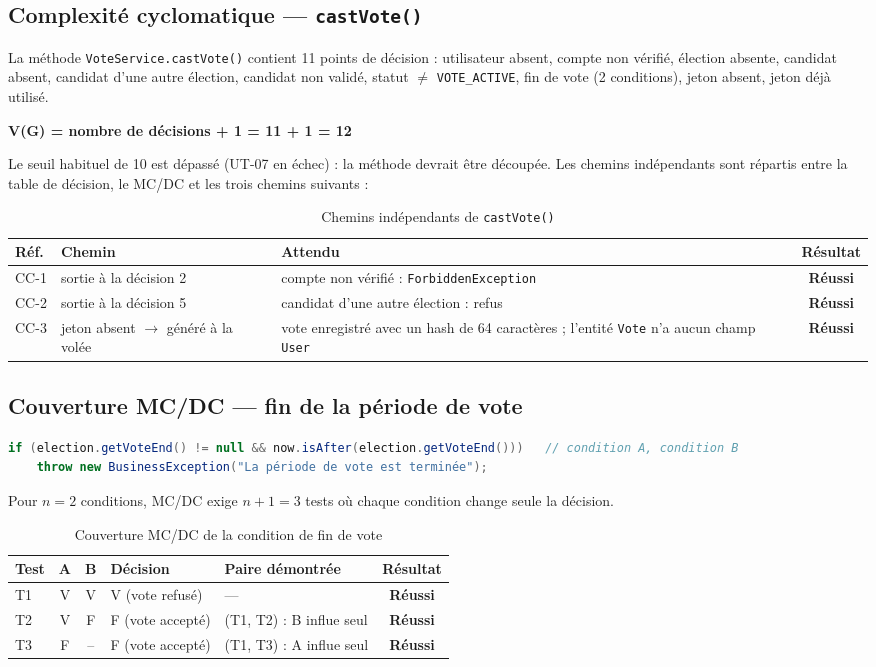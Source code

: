 \documentclass[12pt,a4paper]{report}
\newcommand{\ok}{\textcolor{okgreen}{\textbf{Réussi}}}
\begin{document}
\subsection{Complexité cyclomatique --- \texttt{castVote()}}
La méthode \texttt{VoteService.castVote()} contient 11 points de décision : utilisateur absent, compte non vérifié, élection absente, candidat absent, candidat d'une autre élection, candidat non validé, statut $\neq$ \texttt{VOTE\_ACTIVE}, fin de vote (2 conditions), jeton absent, jeton déjà utilisé.
\begin{center}\textbf{V(G) = nombre de décisions + 1 = 11 + 1 = 12}\end{center}
Le seuil habituel de 10 est dépassé (UT-07 en échec) : la méthode devrait être découpée. Les chemins indépendants sont répartis entre la table de décision, le MC/DC et les trois chemins suivants :
\begin{table}[H]
\centering
\caption{Chemins indépendants de \texttt{castVote()}}
\small
\begin{tabularx}{\textwidth}{@{}lp{4.4cm}Xc@{}}
\toprule
\rowcolor{evlight}\textbf{Réf.} & \textbf{Chemin} & \textbf{Attendu} & \textbf{Résultat}\\
\midrule
CC-1 & sortie à la décision 2 & compte non vérifié : \texttt{ForbiddenException} & \ok\\
CC-2 & sortie à la décision 5 & candidat d'une autre élection : refus & \ok\\
CC-3 & jeton absent $\rightarrow$ généré à la volée & vote enregistré avec un hash de 64 caractères ; l'entité \texttt{Vote} n'a aucun champ \texttt{User} & \ok\\
\bottomrule
\end{tabularx}
\end{table}

\subsection{Couverture MC/DC --- fin de la période de vote}
\begin{lstlisting}[language=Java]
if (election.getVoteEnd() != null && now.isAfter(election.getVoteEnd()))   // condition A, condition B
    throw new BusinessException("La période de vote est terminée");
\end{lstlisting}
Pour $n = 2$ conditions, MC/DC exige $n + 1 = 3$ tests où chaque condition change seule la décision.
\begin{table}[H]
\centering
\caption{Couverture MC/DC de la condition de fin de vote}
\small
\begin{tabular}{@{}lccllc@{}}
\toprule
\rowcolor{evlight}\textbf{Test} & \textbf{A} & \textbf{B} & \textbf{Décision} & \textbf{Paire démontrée} & \textbf{Résultat}\\
\midrule
T1 & V & V & V (vote refusé) & --- & \ok\\
T2 & V & F & F (vote accepté) & (T1, T2) : B influe seul & \ok\\
T3 & F & -- & F (vote accepté) & (T1, T3) : A influe seul & \ok\\
\bottomrule
\end{tabular}
\end{table}
\end{document}
